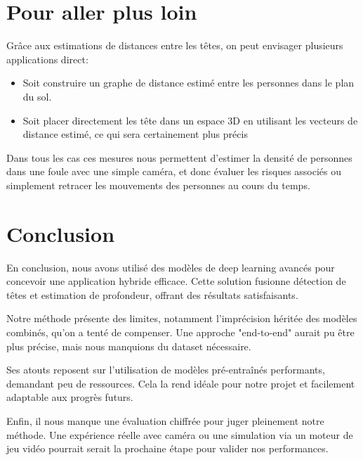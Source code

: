 \section{Pour aller plus loin}

Grâce aux estimations de distances entre les têtes, on peut envisager plusieurs applications direct:

\begin{itemize}
    \item Soit construire un graphe de distance estimé entre les personnes dans le plan du sol.
    \item Soit placer directement les tête dans un espace 3D en utilisant les vecteurs de distance estimé, ce qui sera certainement plus précis 
\end{itemize}

Dans tous les cas ces mesures nous permettent d'estimer la densité de personnes dans une foule avec une simple caméra, et donc évaluer les risques associés ou simplement retracer les mouvements des personnes au cours du temps.

\section{Conclusion}

En conclusion, nous avons utilisé des modèles de deep learning avancés pour concevoir une application hybride efficace. Cette solution fusionne détection de têtes et estimation de profondeur, offrant des résultats satisfaisants.

Notre méthode présente des limites, notamment l’imprécision héritée des modèles combinés, qu’on a tenté de compenser. Une approche "end-to-end" aurait pu être plus précise, mais nous manquions du dataset nécessaire.

Ses atouts reposent sur l’utilisation de modèles pré-entraînés performants, demandant peu de ressources. Cela la rend idéale pour notre projet et facilement adaptable aux progrès futurs.

Enfin, il nous manque une évaluation chiffrée pour juger pleinement notre méthode. Une expérience réelle avec caméra ou une simulation via un moteur de jeu vidéo pourrait serait la prochaine étape pour valider nos performances.
